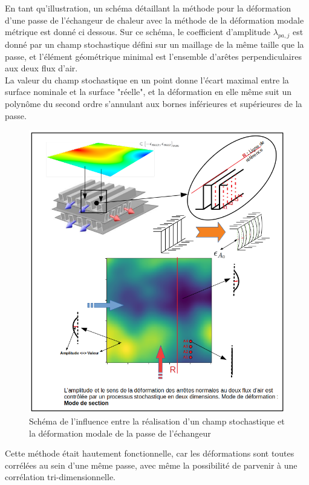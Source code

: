 \documentclass[a4paper,10pt]{article}
\begin{document}
En tant qu'illustration, un schéma détaillant la méthode pour la déformation d'une passe de l'échangeur de chaleur avec la méthode de la déformation modale métrique est donné ci dessous. Sur ce schéma, le coefficient d'amplitude $\lambda_{pa,j}$ est donné par un champ stochastique défini sur un maillage de la même taille que la passe, et l'élément géométrique minimal est l'ensemble d’arêtes perpendiculaires aux deux flux d'air.\\ 
La valeur du champ stochastique en un point donne l'écart maximal entre la surface nominale et la surface "réelle", et la déformation en elle même suit un polynôme du second ordre s'annulant aux bornes inférieures et supérieures de la passe. 


\begin{figure}[H]
   \centering   
   \includegraphics[scale=0.45]{SchemaModesDeformation.png}
      \caption{Schéma de l'influence entre la réalisation d'un champ stochastique et la déformation modale de la passe de l'échangeur}
         \label{SchemaModesDeformation}
\end{figure}

Cette méthode était hautement fonctionnelle, car les déformations sont toutes corrélées au sein d'une même passe, avec même la possibilité de parvenir à une corrélation tri-dimensionnelle. 
\end{document}
